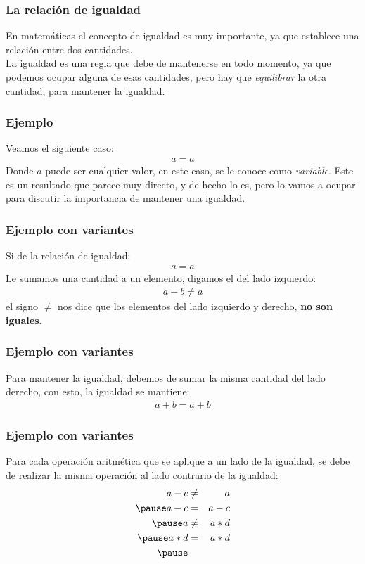 \begin{frame}
\frametitle{La relación de igualdad}
En matemáticas el concepto de igualdad es muy importante, ya que establece una relación entre dos cantidades.
\\
\bigskip
\pause
La igualdad es una regla que debe de mantenerse en todo momento, ya que podemos ocupar alguna de esas cantidades, pero hay que \emph{equilibrar} la otra cantidad, para mantener la igualdad.
\end{frame}
\begin{frame}
\frametitle{Ejemplo}
Veamos el siguiente caso:
\pause
\begin{align*}
a = a
\end{align*}
\pause
Donde $a$ puede ser cualquier valor, en este caso, se le conoce como \emph{variable}. \pause Este es un resultado que parece muy directo, y de hecho lo es, pero lo vamos a ocupar para discutir la importancia de mantener una igualdad.
\end{frame}
\begin{frame}
\frametitle{Ejemplo con variantes}
Si de la relación de igualdad:
\begin{align*}
  a = a
\end{align*}
\pause
Le sumamos una cantidad a un elemento, digamos el del lado izquierdo:
\begin{align*}
a + b \neq a
\end{align*}
\pause
el signo $\neq$ nos dice que los elementos del lado izquierdo y derecho, \textbf{no son iguales}. 
\end{frame}
\begin{frame}
\frametitle{Ejemplo con variantes}
Para mantener la igualdad, debemos de sumar la misma cantidad del lado derecho, con esto, la igualdad se mantiene:
\pause
\begin{align*}
a + b = a + b
\end{align*}
\end{frame}
\begin{frame}
\frametitle{Ejemplo con variantes}
Para cada operación aritmética que se aplique a un lado de la igualdad, se debe de realizar la misma operación al lado contrario de la igualdad:
\begin{eqnarray*}
a - c &\neq& a \\ \pause
a - c &=& a - c \\ \pause
a &\neq& a * d \\ \pause
a * d &=& a * d \\ \pause
\end{eqnarray*}
\end{frame}
